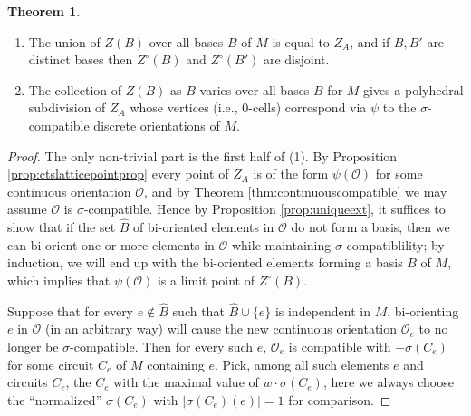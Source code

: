 \documentclass[12pt]{amsart}
\numberwithin{equation}{section}
\theoremstyle{definition}
\newtheorem{theorem}{Theorem}[subsection]
\begin{document}
\begin{theorem} \label{thm:zonotopedecomp}
\begin{enumerate}
\item The union of $Z(B)$ over all bases $B$ of $M$ is equal to $Z_A$, and if $B,B'$ are distinct bases then $Z^\circ(B)$ and $Z^\circ(B')$ are disjoint.
\item The collection of $Z(B)$ as $B$ varies over all bases $B$ for $M$ gives a polyhedral subdivision of $Z_A$ whose vertices (i.e., $0$-cells) correspond via $\psi$ to the $\sigma$-compatible discrete orientations of $M$. 
\end{enumerate}
\end{theorem}

\begin{proof} The only non-trivial part is the first half of (1). By Proposition \ref{prop:ctslatticepointprop} every point of $Z_A$ is of the form $\psi(\mathcal{O})$ for some continuous orientation $\mathcal{O}$, and by Theorem \ref{thm:continuouscompatible} we may assume $\mathcal{O}$ is $\sigma$-compatible. Hence by Proposition \ref{prop:uniqueext}, it suffices to show that if the set $\hat{B}$ of bi-oriented elements in $\mathcal{O}$ do not form a basis, then we can bi-orient one or more elements in $\mathcal{O}$ while maintaining $\sigma$-compatiblility; by induction, we will end up with the bi-oriented elements forming a basis $B$ of $M$, which implies that $\psi(\mathcal{O})$ is a limit point of $Z^\circ(B)$.

Suppose that for every $e\not\in\hat{B}$ such that $\hat{B}\cup\{e\}$ is independent in $M$, bi-orienting $e$ in $\mathcal{O}$ (in an arbitrary way) will cause the new continuous orientation $\mathcal{O}_e$ to no longer be $\sigma$-compatible. Then for every such $e$, $\mathcal{O}_e$ is compatible with $-\sigma(C_e)$ for some circuit $C_e$ of $M$ containing $e$. Pick, among all such elements $e$ and circuits $C_e$, the $C_e$ with the maximal value of $w\cdot\sigma(C_e)$, here we always choose the ``normalized'' $\sigma(C_e)$ with $|\sigma(C_e)(e)|=1$ for comparison.


\end{proof}
\end{document}
